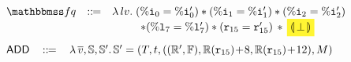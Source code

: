 \begin{figure*}[!t]
\[\begin{array}{cc}
\begin{array}{lcl}
				\relspecpost & \define & \lambda \, lv. \;
                (\ireg{0} = \ireg{0}')
                \sepstar (\ireg{1} = \ireg{1}')
                \sepstar (\ireg{2} = \ireg{2}') 
                \\
				& &
                \hspace*{6ex} 
                \sepstar (\lreg{7} = \lreg{7}')
                \sepstar (\reg{15} = \reg{15}') 
                \, \sepstar \, 
                \colorbox{yellow!80}{$\safePrimAst{\,\primdone\,}$}
            \end{array} \\
            \\[-5pt]
            \multicolumn{2}{l}
            {
                \begin{array}{lcl}
                    \primAdd & \, \define \, & 
                    \lambda \, \args{\val}, \hpstate, \hpstate'. \, 
                    \hpstate' = 
                    (\thrdpool, \thrdid, ((\hRfile', \hWstk), 
                        \hRfile(\reg{15})\!+\!8, 
                        \hRfile(\reg{15})\!+\!12), \Mem)
                    \\
                    \\[-9pt]
                    \multicolumn{3}{l}
                    {
}
\end{array}}
\end{array}\]
\end{figure*}
